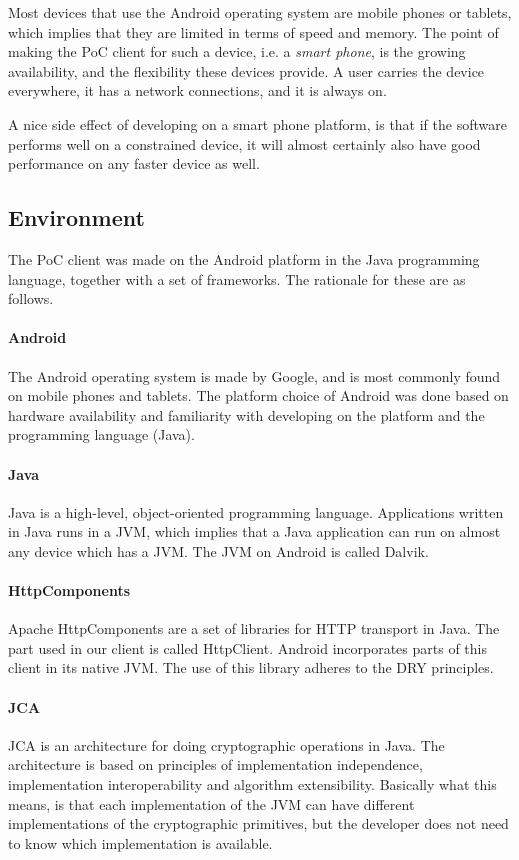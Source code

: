 \documentclass[pdftex,english,10pt,b5paper,twoside]{book}
\begin{document}
Most devices that use the Android operating system are mobile phones or
tablets, which implies that they are limited in terms of speed and
memory. The point of making the \ac{PoC} client for such a device, i.e. a
\emph{smart phone}, is the growing availability, and the flexibility these
devices provide. A user carries the device everywhere, it has a network
connections, and it is always on.

A nice side effect of developing on a smart phone platform, is that if the
software performs well on a constrained device, it will almost certainly also
have good performance on any faster device as well. 

\subsection{Environment}
The \ac{PoC} client was made on the Android platform in the Java programming
language, together with a set of frameworks. The rationale for these are as
follows.

\paragraph{Android} The Android operating system is made by Google, and is most
commonly found on mobile phones and tablets. The platform choice of Android was done
based on hardware availability and familiarity with developing on the
platform and the programming language (Java). 

\paragraph{Java} Java is a high-level, object-oriented programming language.
Applications written in Java runs in a \ac{JVM}, which implies that a Java
application can run on almost any device which has a \ac{JVM}. The \ac{JVM} on
Android is called Dalvik.

\paragraph{HttpComponents} Apache HttpComponents are a set of libraries for
\ac{HTTP} transport in Java. The part used in our client is called HttpClient.
Android incorporates parts of this client in its native \ac{JVM}. The use of
this library adheres to the \ac{DRY} principles.

\paragraph{\ac{JCA}} \ac{JCA} is an architecture for doing cryptographic
operations in Java. The architecture is based on principles of implementation
independence, implementation interoperability and algorithm extensibility.
Basically what this means, is that each implementation of the \ac{JVM} can have
different implementations of the cryptographic primitives, but the developer
does not need to know which implementation is available.
\end{document}
